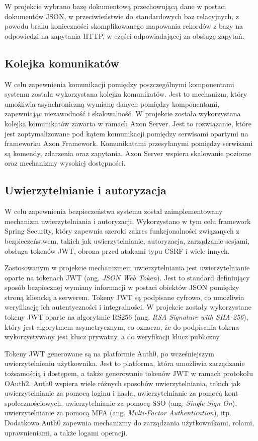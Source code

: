 W projekcie wybrano bazę dokumentową przechowującą dane w postaci dokumentów JSON, w przeciwieństwie do standardowych baz relacyjnych, z powodu braku konieczności skomplikowanego mapowania rekordów z bazy na odpowiedzi na zapytania HTTP, w części odpowiadającej za obsługę zapytań.

\subsection{Kolejka komunikatów}

W celu zapewnienia komunikacji pomiędzy poszczególnymi komponentami systemu została wykorzystana kolejka komunikatów. Jest to mechanizm, który umożliwia asynchroniczną wymianę danych pomiędzy komponentami, zapewniając niezawodność i skalowalność. W projekcie została wykorzystana kolejka komunikatów zawarta w ramach Axon Server. Jest to rozwiązanie, które jest zoptymalizowane pod kątem komunikacji pomiędzy serwisami opartymi na frameworku Axon Framework. Komunikatami przesyłanymi pomiędzy serwisami są komendy, zdarzenia oraz zapytania. Axon Server wspiera skalowanie poziome oraz mechanizmy wysokiej dostępności.

\subsection{Uwierzytelnianie i autoryzacja}

W celu zapewnienia bezpieczeństwa systemu został zaimplementowany mechanizm uwierzytelniania i autoryzacji. Wykorzystano w tym celu framework Spring Security, który zapewnia szeroki zakres funkcjonalności związanych z bezpieczeństwem, takich jak uwierzytelnianie, autoryzacja, zarządzanie sesjami, obsługa tokenów JWT, obrona przed atakami typu CSRF i wiele innych.

Zastosowanym w projekcie mechanizmem uwierzytelniania jest uwierzytelnianie oparte na tokenach JWT (ang. \textit{JSON Web Token}). Jest to standard definiujący sposób bezpiecznej wymiany informacji w postaci obiektów JSON pomiędzy stroną kliencką a serwerem. Tokeny JWT są podpisane cyfrowo, co umożliwia weryfikację ich autentyczności i integralności. W projekcie zostały wykorzystane tokeny JWT oparte na algorytmie RS256 (ang. \textit{RSA Signature with SHA-256}), który jest algorytmem asymetrycznym, co oznacza, że do podpisania tokena wykorzystywany jest klucz prywatny, a do weryfikacji klucz publiczny.

Tokeny JWT generowane są na platformie Auth0, po wcześniejszym uwierzytelnieniu użytkownika. Jest to platforma, która umożliwia zarządzanie tożsamością i dostępem, a także generowanie tokenów JWT w ramach protokołu OAuth2. Auth0 wspiera wiele różnych sposobów uwierzytelniania, takich jak uwierzytelnianie za pomocą loginu i hasła, uwierzytelnianie za pomocą kont społecznościowych, uwierzytelnianie za pomocą SSO (ang. \textit{Single Sign-On}), uwierzytelnianie za pomocą MFA (ang. \textit{Multi-Factor Authentication}), itp. Dodatkowo Auth0 zapewnia mechanizmy do zarządzania użytkownikami, rolami, uprawnieniami, a także logami operacji.

